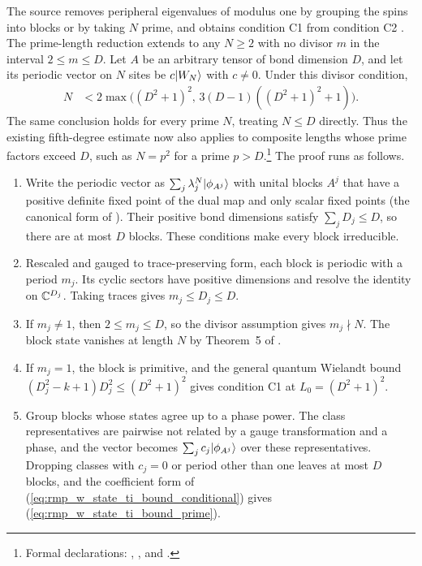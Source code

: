 \documentclass{article}
\begin{document}
The source removes peripheral eigenvalues of modulus one by grouping the spins
into blocks or by taking $N$ prime, and obtains condition C1 from condition C2
\cite[lines~2090--2097]{PerezGarcia2007MPSReps}. The prime-length reduction
extends to any $N\geq2$ with no divisor $m$ in the interval $2\leq m\leq D$.
Let $A$ be an arbitrary tensor of bond dimension $D$, and let its periodic
vector on $N$ sites be $c|W_N\rangle$ with $c\neq0$. Under this divisor condition,
\begin{align}
    N
     & <
    2\max\bigl((D^2+1)^2,\,3(D-1)((D^2+1)^2+1)\bigr).
    \label{eq:rmp_w_state_ti_bound_prime}
\end{align}
The same conclusion holds for every prime $N$, treating $N\leq D$ directly.
Thus the existing fifth-degree estimate now also applies to composite lengths
whose prime factors exceed $D$, such as $N=p^2$ for a prime $p>D$.\footnote{Formal
    declarations:
    ,
    , and
    .}
The proof runs as follows.
\begin{enumerate}
    \item Write the periodic vector as
          $\sum_j\lambda_j^N|\phi_{A^j}\rangle$ with unital blocks $A^j$ that
          have a positive definite fixed point of the dual map and only scalar
          fixed points (the canonical form of
          \cite[lines~742--763]{PerezGarcia2007MPSReps}). Their positive bond
          dimensions satisfy $\sum_jD_j\leq D$, so there are at most $D$ blocks.
          These conditions make every block irreducible.

    \item Rescaled and gauged to trace-preserving form, each block is periodic
          with a period $m_j$. Its cyclic sectors have positive dimensions and
          resolve the identity on $\mathbb{C}^{D_j}$. Taking traces gives
          $m_j\leq D_j\leq D$.

    \item If $m_j\neq1$, then $2\leq m_j\leq D$, so the divisor assumption
          gives $m_j\nmid N$. The block state vanishes at length $N$ by
          Theorem~5 of \cite[lines~849--858]{PerezGarcia2007MPSReps}.

    \item If $m_j=1$, the block is primitive, and the general quantum Wielandt
          bound $(D_j^2-k+1)D_j^2\leq(D^2+1)^2$
          \cite{Sanz2010Quantum,Wolf2012Quantum} gives condition C1 at
          $L_0=(D^2+1)^2$.

    \item Group blocks whose states agree up to a phase power. The class
          representatives are pairwise not related by a gauge transformation
          and a phase, and the vector becomes $\sum_jc_j|\phi_{A^j}\rangle$ over
          these representatives. Dropping classes with $c_j=0$ or period
          other than one leaves at most $D$ blocks, and the coefficient form
          of (\ref{eq:rmp_w_state_ti_bound_conditional}) gives
          (\ref{eq:rmp_w_state_ti_bound_prime}).
\end{enumerate}
\end{document}
